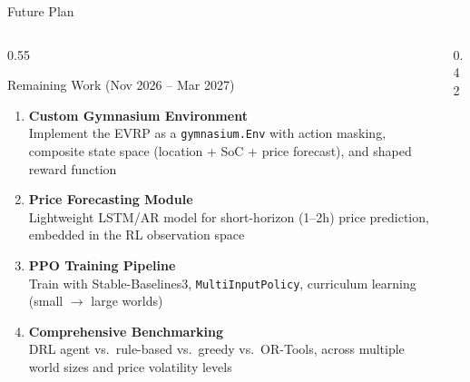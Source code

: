 \documentclass[aspectratio=169, 11pt]{beamer}
\begin{document}
\begin{frame}{Future Plan}

\begin{columns}[T]
\begin{column}{0.55\textwidth}

\begin{block}{Remaining Work (Nov 2026 -- Mar 2027)}
\begin{enumerate}
    \item \textbf{Custom Gymnasium Environment} \\
    {\small Implement the EVRP as a \texttt{gymnasium.Env} with action masking, composite state space (location + SoC + price forecast), and shaped reward function}

    \vspace{0.3em}
    \item \textbf{Price Forecasting Module} \\
    {\small Lightweight LSTM/AR model for short-horizon (1--2h) price prediction, embedded in the RL observation space}

    \vspace{0.3em}
    \item \textbf{PPO Training Pipeline} \\
    {\small Train with Stable-Baselines3, \texttt{MultiInputPolicy}, curriculum learning (small $\to$ large worlds)}

    \vspace{0.3em}
    \item \textbf{Comprehensive Benchmarking} \\
    {\small DRL agent vs.\ rule-based vs.\ greedy vs.\ OR-Tools, across multiple world sizes and price volatility levels}
\end{enumerate}
\end{block}

\end{column}
\begin{column}{0.42\textwidth}


\end{column}
\end{columns}
\end{frame}
\end{document}
